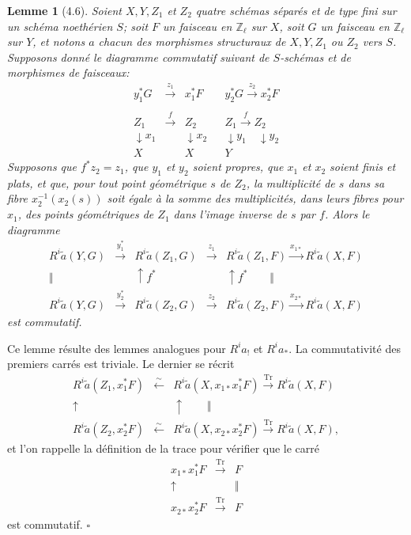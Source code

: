 \documentclass[10pt]{article}
\newcommand{\Z}{\mathbb Z}
\newcommand{\Tr}{\operatorname{Tr}}
\newcommand{\QED}{\hfill$\square$}
\newtheorem*{lemma}{Lemme}
\begin{document}
\begin{lemma}[4.6]
Soient $X,Y,Z_1$ et $Z_2$ quatre schémas séparés et de type fini sur un schéma noethérien $S$; soit $F$ un faisceau en $\Z_\ell$ sur $X$, soit $G$ un faisceau en $\Z_\ell$ sur $Y$, et notons $a$ chacun des morphismes structuraux de $X,Y,Z_1$ ou $Z_2$ vers $S$. Supposons donné le diagramme commutatif suivant de $S$-schémas et de morphismes de faisceaux:
\[
\begin{array}{ccccc}
y_1^*G&\xrightarrow{z_1}&x_1^*F&&y_2^*G\xrightarrow{z_2}x_2^*F\\
&&&&\\[-1em]
Z_1&\xrightarrow{f}&Z_2&&Z_1\xrightarrow{f}Z_2\\[-0.2em]
\downarrow x_1&&\downarrow x_2&&\downarrow y_1\quad\downarrow y_2\\[-0.2em]
X&&X&&Y
\end{array}
\]
Supposons que $f^*z_2=z_1$, que $y_1$ et $y_2$ soient propres, que $x_1$ et $x_2$ soient finis et plats, et que, pour tout point géométrique $s$ de $Z_2$, la multiplicité de $s$ dans sa fibre $x_2^{-1}(x_2(s))$ soit égale à la somme des multiplicités, dans leurs fibres pour $x_1$, des points géométriques de $Z_1$ dans l'image inverse de $s$ par $f$. Alors le diagramme
\[
\begin{array}{ccccc}
R^i\widetilde a(Y,G)&\xrightarrow{y_1^*}&R^i\widetilde a(Z_1,G)&\xrightarrow{z_1}&R^i\widetilde a(Z_1,F)\xrightarrow{x_{1*}}R^i\widetilde a(X,F)\\
\Vert&&\uparrow f^*&&\uparrow f^*\qquad\Vert\\
R^i\widetilde a(Y,G)&\xrightarrow{y_2^*}&R^i\widetilde a(Z_2,G)&\xrightarrow{z_2}&R^i\widetilde a(Z_2,F)\xrightarrow{x_{2*}}R^i\widetilde a(X,F)
\end{array}
\]
est commutatif.
\end{lemma}

Ce lemme résulte des lemmes analogues pour $R^ia_!$ et $R^ia_*$. La commutativité des premiers carrés est triviale. Le dernier se récrit
\[
\begin{array}{ccc}
R^i\widetilde a(Z_1,x_1^*F)&\xleftarrow{\sim}&R^i\widetilde a(X,x_{1*}x_1^*F)\xrightarrow{\Tr}R^i\widetilde a(X,F)\\
\uparrow&&\uparrow\qquad\Vert\\
R^i\widetilde a(Z_2,x_2^*F)&\xleftarrow{\sim}&R^i\widetilde a(X,x_{2*}x_2^*F)\xrightarrow{\Tr}R^i\widetilde a(X,F),
\end{array}
\]
et l'on rappelle la définition de la trace pour vérifier que le carré
\[
\begin{array}{ccc}
x_{1*}x_1^*F&\xrightarrow{\Tr}&F\\
\uparrow&&\Vert\\
x_{2*}x_2^*F&\xrightarrow{\Tr}&F
\end{array}
\]
est commutatif. \QED
\end{document}
